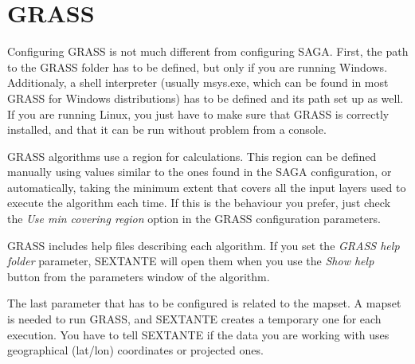 \section{GRASS}

Configuring GRASS is not much different from configuring SAGA. First, the path to the GRASS folder has to be defined, but only if you are running Windows. Additionaly, a shell interpreter (usually msys.exe, which can be found in most GRASS for Windows distributions) has to be defined and its path set up as well. If you are running Linux, you just have to make sure that GRASS is correctly installed, and that it can be run without problem from a console.

GRASS algorithms use a region for calculations. This region can be defined manually using values similar to the ones found in the SAGA configuration, or automatically, taking the minimum extent that covers all the input layers used to execute the algorithm each time. If this is the behaviour you prefer, just check the \emph{Use min covering region} option in the GRASS configuration parameters.

GRASS includes help files describing each algorithm. If you set the \emph{GRASS help folder} parameter, SEXTANTE will open them when you use the \emph{Show help} button from the parameters window of the algorithm.

The last parameter that has to be configured is related to the mapset. A mapset is needed to run GRASS, and SEXTANTE creates a temporary one for each execution. You have to tell SEXTANTE if the data you are working with uses geographical (lat/lon) coordinates or projected ones.










